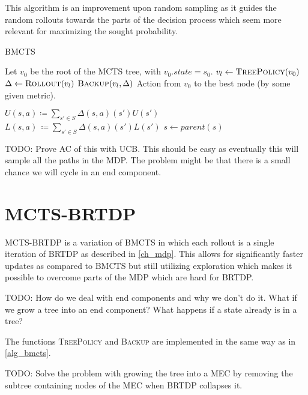 This algorithm is an improvement upon random sampling as it guides the
random rollouts towards the parts of the decision process which seem
more relevant for maximizing the sought probability.

\begin{algorithm}
\caption{BMCTS}
\label{alg_bmcts}
\begin{algorithmic}
    \State Let $v_0$ be the root of the MCTS tree, with $v_0.state = s_0$.
        \State $v_l \gets \Call{TreePolicy}{v_0}$
        \State $\Delta \gets \Call{Rollout}{v_l}$
        \State $\Call{Backup}{v_l, \Delta}$
    \EndWhile
    \State \Return Action from $v_0$ to the best node (by some
    given metric).
\EndFunction

\EndFunction

\Repeat
{}
\EndFunction

\Repeat
    \State $U(s,a) \coloneqq \sum_{s' \in S} \Delta(s,a)(s')U(s')$
    \State $L(s,a)\, \coloneqq \sum_{s' \in S} \Delta(s,a)(s')L(s')$
    \State $s \gets parent(s)$
\EndFunction
\end{algorithmic}
\end{algorithm}


TODO: Prove AC of this with UCB. This should be easy as eventually this will sample all
the paths in the MDP. The problem might be that there is a small chance
we will cycle in an end component.


\section{MCTS-BRTDP}

MCTS-BRTDP is a variation of BMCTS in which each rollout is a
single iteration of BRTDP as described in \autoref{ch_mdp}. This allows
for significantly faster updates as compared to BMCTS but still
utilizing exploration which makes it possible to overcome parts of the
MDP which are hard for BRTDP.

TODO: How do we deal with end components and why we don't do it. What if
we grow a tree into an end component? What happens if a state already is
in a tree?

The functions \textsc{TreePolicy} and \textsc{Backup} are implemented in
the same way as in \autoref{alg_bmcts}.

TODO: Solve the problem with growing the tree into a MEC by removing the
subtree containing nodes of the MEC when BRTDP collapses it.

